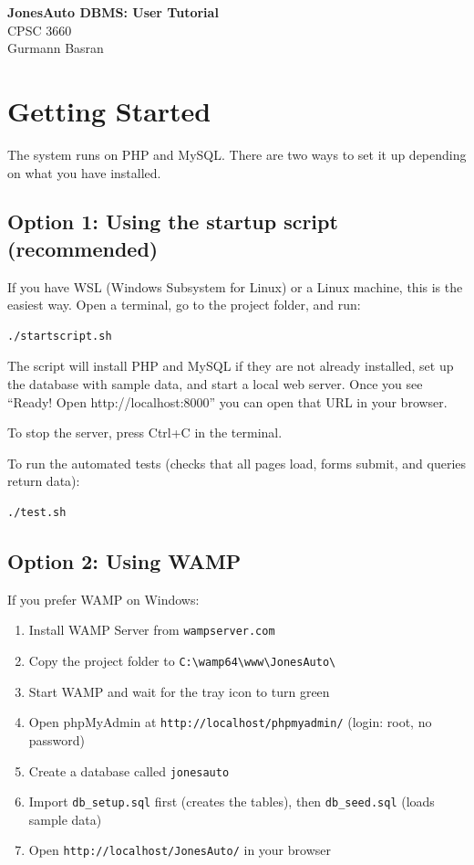 \documentclass[12pt]{article}
\begin{document}
\begin{center}
{\Large \textbf{JonesAuto DBMS: User Tutorial}}\\[0.3cm]
CPSC 3660\\[0.2cm]
Gurmann Basran
\end{center}
\vspace{0.3cm}

\section{Getting Started}

The system runs on PHP and MySQL. There are two ways to set it up depending on what you have installed.

\subsection{Option 1: Using the startup script (recommended)}

If you have WSL (Windows Subsystem for Linux) or a Linux machine, this is the easiest way. Open a terminal, go to the project folder, and run:

\begin{lstlisting}[style=code]
./startscript.sh
\end{lstlisting}

The script will install PHP and MySQL if they are not already installed, set up the database with sample data, and start a local web server. Once you see ``Ready! Open http://localhost:8000'' you can open that URL in your browser.

To stop the server, press Ctrl+C in the terminal.

To run the automated tests (checks that all pages load, forms submit, and queries return data):

\begin{lstlisting}[style=code]
./test.sh
\end{lstlisting}

\subsection{Option 2: Using WAMP}

If you prefer WAMP on Windows:

\begin{enumerate}
  \item Install WAMP Server from \texttt{wampserver.com}
  \item Copy the project folder to \texttt{C:\textbackslash wamp64\textbackslash www\textbackslash JonesAuto\textbackslash}
  \item Start WAMP and wait for the tray icon to turn green
  \item Open phpMyAdmin at \texttt{http://localhost/phpmyadmin/} (login: root, no password)
  \item Create a database called \texttt{jonesauto}
  \item Import \texttt{db\_setup.sql} first (creates the tables), then \texttt{db\_seed.sql} (loads sample data)
  \item Open \texttt{http://localhost/JonesAuto/} in your browser
\end{enumerate}
\end{document}
